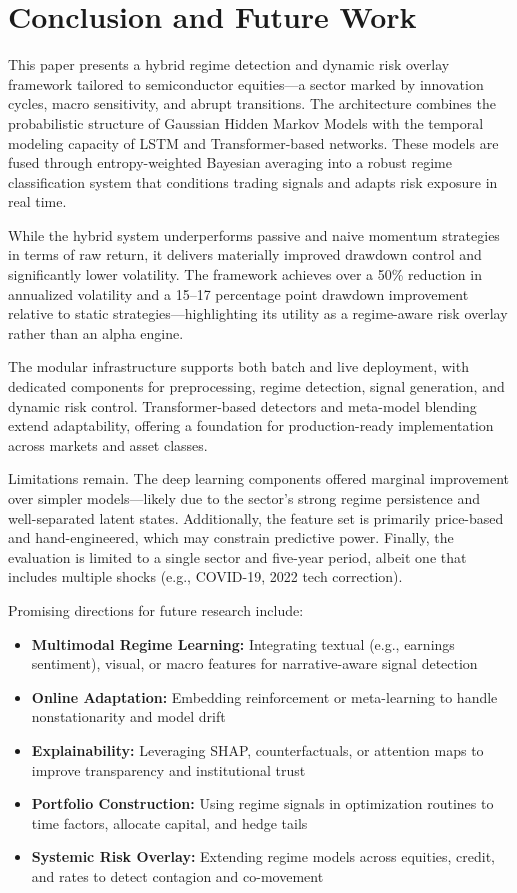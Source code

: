 \section{Conclusion and Future Work}

This paper presents a hybrid regime detection and dynamic risk overlay framework tailored to semiconductor equities—a sector marked by innovation cycles, macro sensitivity, and abrupt transitions. The architecture combines the probabilistic structure of Gaussian Hidden Markov Models with the temporal modeling capacity of LSTM and Transformer-based networks. These models are fused through entropy-weighted Bayesian averaging into a robust regime classification system that conditions trading signals and adapts risk exposure in real time.

While the hybrid system underperforms passive and naive momentum strategies in terms of raw return, it delivers materially improved drawdown control and significantly lower volatility. The framework achieves over a 50\% reduction in annualized volatility and a 15--17 percentage point drawdown improvement relative to static strategies—highlighting its utility as a regime-aware risk overlay rather than an alpha engine.

The modular infrastructure supports both batch and live deployment, with dedicated components for preprocessing, regime detection, signal generation, and dynamic risk control. Transformer-based detectors and meta-model blending extend adaptability, offering a foundation for production-ready implementation across markets and asset classes.

Limitations remain. The deep learning components offered marginal improvement over simpler models—likely due to the sector’s strong regime persistence and well-separated latent states. Additionally, the feature set is primarily price-based and hand-engineered, which may constrain predictive power. Finally, the evaluation is limited to a single sector and five-year period, albeit one that includes multiple shocks (e.g., COVID-19, 2022 tech correction).

Promising directions for future research include:

\begin{itemize}
    \item \textbf{Multimodal Regime Learning:} Integrating textual (e.g., earnings sentiment), visual, or macro features for narrative-aware signal detection
    \item \textbf{Online Adaptation:} Embedding reinforcement or meta-learning to handle nonstationarity and model drift
    \item \textbf{Explainability:} Leveraging SHAP, counterfactuals, or attention maps to improve transparency and institutional trust
    \item \textbf{Portfolio Construction:} Using regime signals in optimization routines to time factors, allocate capital, and hedge tails
    \item \textbf{Systemic Risk Overlay:} Extending regime models across equities, credit, and rates to detect contagion and co-movement
\end{itemize}

